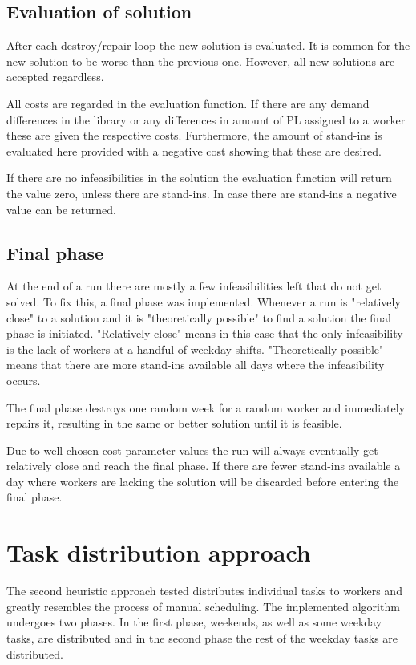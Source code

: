 \subsection{Evaluation of solution}
After each destroy/repair loop the new solution is evaluated. It is common for the new solution to be worse than the previous one. However, all new solutions are accepted regardless.

All costs are regarded in the evaluation function. If there are any demand differences in the library or any differences in amount of PL assigned to a worker these are given the respective costs. Furthermore, the amount of stand-ins is evaluated here provided with a negative cost showing that these are desired.

If there are no infeasibilities in the solution the evaluation function will return the value zero, unless there are stand-ins. In case there are stand-ins a negative value can be returned. 
\subsection{Final phase}
At the end of a run there are mostly a few infeasibilities left that do not get solved. To fix this, a final phase was implemented. Whenever a run is "relatively close" to a solution and it is "theoretically possible" to find a solution the final phase is initiated. "Relatively close" means in this case that the only infeasibility is the lack of workers at a handful of weekday shifts. "Theoretically possible" means that there are more stand-ins available all days where the infeasibility occurs.

The final phase destroys one random week for a random worker and immediately repairs it, resulting in the same or better solution until it is feasible. %

Due to well chosen cost parameter values the run will always eventually get relatively close and reach the final phase. If there are fewer stand-ins available a day where workers are lacking the solution will be discarded before entering the final phase. 

\section{Task distribution approach}

The second heuristic approach tested distributes individual tasks to workers and greatly resembles the process of manual scheduling. The implemented algorithm undergoes two phases. In the first phase, weekends, as well as some weekday tasks, are distributed and in the second phase the rest of the weekday tasks are distributed. 

